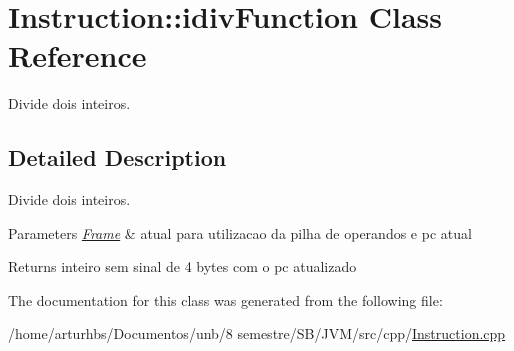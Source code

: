 \hypertarget{classInstruction_1_1idivFunction}{}\section{Instruction\+:\+:idiv\+Function Class Reference}
\label{classInstruction_1_1idivFunction}


Divide dois inteiros.  




\subsection{Detailed Description}
Divide dois inteiros. 


\begin{DoxyParams}{Parameters}
{\em \hyperlink{classFrame}{Frame}} & atual para utilizacao da pilha de operandos e pc atual \\
\hline
\end{DoxyParams}
\begin{DoxyReturn}{Returns}
inteiro sem sinal de 4 bytes com o pc atualizado 
\end{DoxyReturn}


The documentation for this class was generated from the following file\+:\begin{DoxyCompactItemize}
\item 
/home/arturhbs/\+Documentos/unb/8 semestre/\+S\+B/\+J\+V\+M/src/cpp/\hyperlink{Instruction_8cpp}{Instruction.\+cpp}\end{DoxyCompactItemize}
